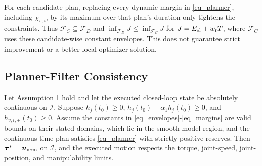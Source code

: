 \begin{remark}
For each candidate plan, replacing every dynamic margin in
\eqref{eq_planner}, including $\chi_{v,i}$, by its maximum over
that plan's duration only tightens the constraints. Thus
$\mathcal F_C\subseteq\mathcal F_D$ and
$\inf_{\mathcal F_D}J\le\inf_{\mathcal F_C}J$ for
$J=E_{\rm el}+w_tT$, where $\mathcal F_C$ uses these
candidate-wise constant envelopes. This does not guarantee
strict improvement or a better local optimizer solution.
\end{remark}

\subsection{Planner-Filter Consistency}

\begin{theorem}\label{thm_consistency}
Let Assumption 1 hold and let the executed closed-loop state be absolutely continuous on $\mathcal I$. Suppose $h_j(t_0)\ge0$, $\dot h_j(t_0)+\alpha_1h_j(t_0)\ge0$, and $h_{v,i,\pm}(t_0)\ge0$. Assume the constants in \eqref{eq_envelopes}-\eqref{eq_margins} are valid bounds on their stated domains, which lie in the smooth model region, and the continuous-time plan satisfies \eqref{eq_planner} with strictly positive reserves. Then $\bm\tau^*=\bm u_{\rm nom}$ on $\mathcal I$, and the executed motion respects the torque, joint-speed, joint-position, and manipulability limits.
\end{theorem}

